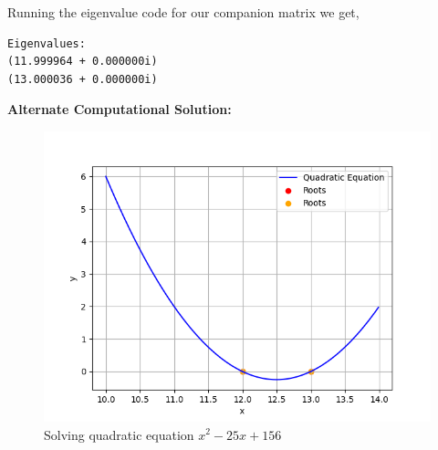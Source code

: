 \documentclass[journal]{IEEEtran}
\begin{document}
Running the eigenvalue code for our companion matrix we get,
\begin{verbatim}
Eigenvalues:
(11.999964 + 0.000000i) 
(13.000036 + 0.000000i)\end{verbatim}
\textbf{Alternate Computational Solution: }\newline
\begin{figure}[h!]
   \centering
   \includegraphics[width=1\columnwidth]{figs/fig.png}
   \caption{Solving quadratic equation $x^2 - 25x + 156$}
   \label{stemplot}
\end{figure}
\end{document}
